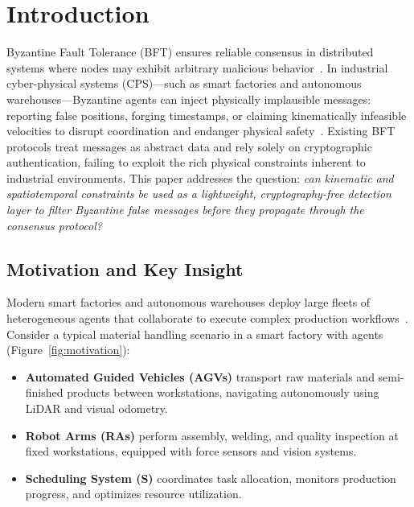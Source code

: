 \documentclass[manuscript,screen,review]{acmart}
\begin{document}
\maketitle


\section{Introduction}
\label{sec:introduction}

Byzantine Fault Tolerance (BFT) ensures reliable consensus in distributed systems where nodes may exhibit arbitrary malicious behavior~\cite{wu2024half, liu2024improved}. In industrial cyber-physical systems (CPS)---such as smart factories and autonomous warehouses---Byzantine agents can inject physically implausible messages: reporting false positions, forging timestamps, or claiming kinematically infeasible velocities to disrupt coordination and endanger physical safety~\cite{bhamare2020cybersecurity}. Existing BFT protocols treat messages as abstract data and rely solely on cryptographic authentication, failing to exploit the rich physical constraints inherent to industrial environments. This paper addresses the question: \textit{can kinematic and spatiotemporal constraints be used as a lightweight, cryptography-free detection layer to filter Byzantine false messages before they propagate through the consensus protocol?}

\subsection{Motivation and Key Insight}

Modern smart factories and autonomous warehouses deploy large fleets of heterogeneous agents that collaborate to execute complex production workflows~\cite{vlachos2024smart}. Consider a typical material handling scenario in a smart factory with agents (Figure~\ref{fig:motivation}):
\begin{itemize}
        \item \textbf{Automated Guided Vehicles (AGVs)} transport raw materials and semi-finished products between workstations, navigating autonomously using LiDAR and visual odometry.
        \item \textbf{Robot Arms (RAs)} perform assembly, welding, and quality inspection at fixed workstations, equipped with force sensors and vision systems.
        \item \textbf{Scheduling System (S)} coordinates task allocation, monitors production progress, and optimizes resource utilization.
\end{itemize}
\end{document}
